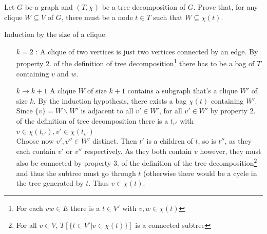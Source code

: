 \documentclass{article}
\begin{document}
\begin{exercise}
    Let $G$ be a graph and $(T,\chi)$ be a tree decomposition of $G$. Prove that, for any clique $W\subseteq V$ of $G$, there must be a node $t\in T$ such that $W\subseteq \chi(t)$.
\end{exercise}
\begin{solving}
    Induction by the size of a clique.
    \begin{enumerate}
        \item[$k= 2$]: A clique of two vertices is just two vertices connected by an edge. By property 2. of the definition of tree decomposition\footnote{ For each $vw\in E$ there is a $t\in V'$ with $v,w\in \chi(t)$}  there has to be a bag of $T$ containing $v$ and $w$.
        \item[$k\to k+1$] A clique $W$ of size $k+1$ contains a subgraph that's a clique $W'$ of size $k$. By the induction hypothesis, there exists a bag $\chi(t)$ containing $W'$. Since $\{v\} = W\backslash W'$ is adjacent to all $v'\in W'$, for all $v'\in W'$ by property 2. of the definition of tree decomposition there is a $t_{v'}$ with $v\in \chi(t_{v'}), v'\in \chi (t_{v'})$\\
        Choose now $v', v'' \in W'$ distinct. Then $t'$ is a children of $t$, so is $t''$, as they each contain $v'$ or $v''$ respectively. As they both contain $v$ however, they must also be connected by property 3. of the definition of the tree decomposition\footnote{For all $v\in V$, $T[\{t\in V'| v\in \chi(t)\}]$ is a connected subtree} and thus the subtree must go through $t$ (otherwise there would be a cycle in the tree generated by $t$. Thus $v\in\chi (t)$.
    \end{enumerate}
\end{solving}
\newpage
\end{document}
